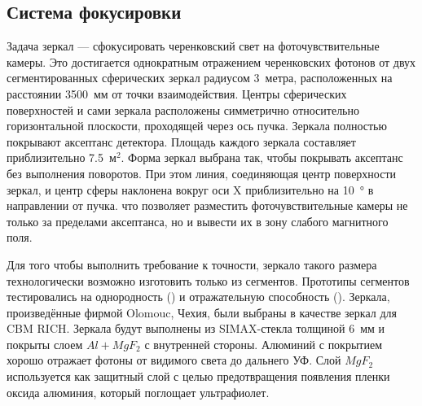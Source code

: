 \subsection{Система фокусировки}\label{sec:CbmRichMirrors}

Задача зеркал --- сфокусировать черенковский свет на фоточувствительные камеры. Это достигается однократным отражением черенковских фотонов от двух сегментированных сферических зеркал радиусом 3~метра, расположенных на расстоянии 3500~мм от точки взаимодействия.
Центры сферических поверхностей и сами зеркала расположены симметрично относительно горизонтальной плоскости, проходящей через ось пучка.
Зеркала полностью покрывают аксептанс детектора. Площадь каждого зеркала составляет приблизительно 7.5~м$^2$. Форма зеркал выбрана так, чтобы покрывать аксептанс без выполнения поворотов. При этом линия, соединяющая центр поверхности зеркал, и центр сферы наклонена вокруг оси X приблизительно на \SI{10}{\degree} в направлении от пучка.
что позволяет разместить фоточувствительные камеры не только за пределами аксептанса, но и вывести их в зону слабого магнитного поля.

Для того чтобы выполнить требование к точности, зеркало такого размера технологически возможно изготовить только из сегментов. Прототипы сегментов тестировались на однородность (\cite{}) и отражательную способность (\cite{}). Зеркала, произведённые фирмой Olomouc, Чехия, были выбраны в качестве зеркал для CBM RICH. Зеркала будут выполнены из SIMAX-стекла толщиной 6~мм и покрыты слоем $Al+MgF_{2}$ с внутренней стороны. Алюминий с покрытием хорошо отражает фотоны от видимого света до дальнего УФ. Слой $MgF_{2}$ используется как защитный слой с целью предотвращения появления пленки оксида алюминия, который поглощает ультрафиолет.


